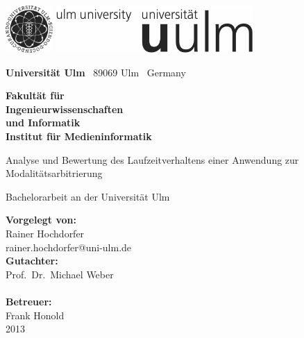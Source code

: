 \documentclass[
    a4paper,
    10pt,
    bibliography=totoc,
    twoside,
    openany,
    numbers=noenddot,
    headings=normal,
    DIV=9,
    parskip
]{scrbook}
\makeatletter
\newcommand{\fullname}{Rainer Hochdorfer}
\newcommand{\email}{rainer.hochdorfer@uni-ulm.de}
\newcommand{\titel}{Analyse und Bewertung des Laufzeitverhaltens einer Anwendung zur Modalitätsarbitrierung}
\newcommand{\jahr}{2013}
\newcommand{\gutachterA}{Prof.\ Dr.\ Michael Weber}
\newcommand{\gutachterB}{}
\newcommand{\betreuer}{Frank Honold}
\newcommand{\fakultaet}{Ingenieurwissenschaften\\und Informatik}
\newcommand{\institut}{Institut für Medieninformatik}
\newcommand{\arbeit}{Bachelorarbeit}
\makeatother
\begin{document}


\thispagestyle{empty}
\begin{addmargin*}[4mm]{-32mm}
    \includegraphics[height=1.8cm]{images/unilogo_bild}
    \hfill
    \includegraphics[height=1.8cm]{images/unilogo_wort}
    \vspace*{2.1em}

    \footnotesize
    \textbf{Universität Ulm} \textbar ~89069 Ulm \textbar ~Germany
    \hfill
    \parbox[t]{42mm}{\bfseries Fakultät für\\\fakultaet\\\mdseries\institut}
    \vspace*{2cm}

    \parbox{140mm}{\bfseries \raggedright \huge \titel}

    {\arbeit{} an der Universität Ulm}
    \vspace*{4em}

    \textbf{Vorgelegt von:}\\\fullname\\\email\\[2em]
    \textbf{Gutachter:}\\\gutachterA\\\gutachterB\\[2em]
    \textbf{Betreuer:}\\\betreuer\\[1.5em]
    \jahr
\end{addmargin*}













\end{document}
